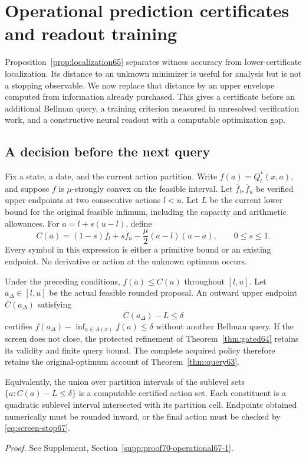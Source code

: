 \section{Operational prediction certificates and readout training}\label{sec:operational67}
Proposition~\ref{prop:localization65} separates witness accuracy from lower-certificate localization. Its distance to an unknown minimizer is useful for analysis but is not a stopping observable. We now replace that distance by an upper envelope computed from information already purchased. This gives a certificate before an additional Bellman query, a training criterion measured in unresolved verification work, and a constructive neural readout with a computable optimization gap.

\subsection{A decision before the next query}
Fix a state, a date, and the current action partition. Write $f(a)=Q_t^*(x,a)$, and suppose $f$ is $\mu$-strongly convex on the feasible interval. Let $\overline f_l,\overline f_u$ be verified upper endpoints at two consecutive actions $l<u$. Let $L$ be the current lower bound for the original feasible infimum, including the capacity and arithmetic allowances. For $a=l+s(u-l)$, define
\begin{equation}\label{eq:screen67}
 C(a)=(1-s)\overline f_l+s\overline f_u
       -\frac\mu2 (a-l)(u-a),\qquad 0\le s\le1.
\end{equation}
Every symbol in this expression is either a primitive bound or an existing endpoint. No derivative or action at the unknown optimum occurs.

\begin{theorem}\label{thm:screen67}
Under the preceding conditions, $f(a)\le C(a)$ throughout $[l,u]$. Let $a_\Delta\in[l,u]$ be the actual feasible rounded proposal. An outward upper endpoint $\overline C(a_\Delta)$ satisfying
\begin{equation}\label{eq:screen-stop67}
 \overline C(a_\Delta)-L\le\delta
\end{equation}
certifies $f(a_\Delta)-\inf_{a\in A(x)}f(a)\le\delta$ without another Bellman query. If the screen does not close, the protected refinement of Theorem~\ref{thm:gated64} retains its validity and finite query bound. The complete acquired policy therefore retains the original-optimum account of Theorem~\ref{thm:query63}.

Equivalently, the union over partition intervals of the sublevel sets $\{a:C(a)-L\le\delta\}$ is a computable certified action set. Each constituent is a quadratic sublevel interval intersected with its partition cell. Endpoints obtained numerically must be rounded inward, or the final action must be checked by \eqref{eq:screen-stop67}.
\end{theorem}
\noindent\emph{Proof.} See Supplement, Section~\ref{supp:proof70-operational67-1}.


